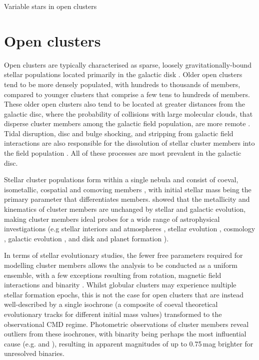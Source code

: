 Variable stars in open clusters




\section{Open clusters}

Open clusters are typically characterised as sparse, loosely gravitationally-bound stellar populations located primarily in the galactic disk \citep{friel_old_1995}. Older open clusters tend to be more densely populated, with hundreds to thousands of members, compared to younger clusters that comprise a few tens to hundreds of members. These older open clusters also tend to be located at greater distances from the galactic disc, where the probability of collisions with large molecular clouds, that disperse cluster members among the galactic field population, are more remote \citep{}.  Tidal disruption, disc and bulge shocking, and stripping from galactic field interactions are also responsible for the dissolution of stellar cluster members into the field population \citep{marchi_search_2006}. All of these processes are most prevalent in the galactic disc.

Stellar cluster populations form within a single nebula and consist of coeval, isometallic, cospatial and comoving members \citep{baade_resolution_1944}, with initial stellar mass being the primary parameter that differentiates members. \citet{mould_stellar_1982} showed that the metallicity and kinematics of cluster members are unchanged by stellar and galactic evolution, making cluster members ideal probes for a wide range of astrophysical investigations (e.g stellar interiors and atmospheres \citep{}, stellar evolution \citep{kalirai_jason_s._star_2010}, cosmology \citep{}, galactic evolution \citep{de_grijs_revolution_2010}, and disk and planet formation \citep{}).

In terms of stellar evolutionary studies, the fewer free parameters required for modelling cluster members allows the analysis to be conducted as a uniform ensemble, with a few exceptions resulting from rotation, magnetic field interactions and binarity \citep{carroll_introduction_2006}. Whilst globular clusters may experience multiple stellar formation epochs, this is not the case for open clusters \citep{li_stellar_2016} that are instead well-described by a single isochrone (a composite of coeval theoretical evolutionary tracks for different initial mass values) transformed to the observational CMD regime. Photometric observations of cluster members reveal outliers from these isochrones, with binarity being perhaps the most influential cause (e.g. \citet{duquennoy_multiplicity_1991} and \citet{murphy_finding_2018}), resulting in apparent magnitudes of up to 0.75\,mag brighter for unresolved binaries.

